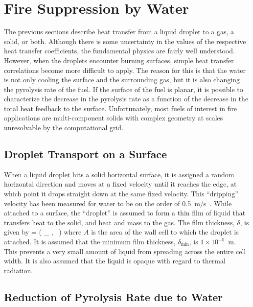 \section{Fire Suppression by Water}

The previous sections describe heat transfer from a liquid droplet to a gas, a solid, or both. Although there is some
uncertainty in the values of the respective heat transfer coefficients,
the fundamental physics are fairly well understood. However, when
the droplets encounter burning surfaces,
simple heat transfer correlations become more difficult to apply.
The reason for this is that the water is not only cooling the surface
and the surrounding gas, but it is also changing the pyrolysis rate
of the fuel. If the surface of the fuel is planar, it is possible
to characterize the decrease in the pyrolysis rate as a function of
the decrease in the total heat feedback to the surface. Unfortunately,
most fuels of interest in fire applications are multi-component solids
with complex geometry at scales unresolvable by the computational grid.

\subsection{Droplet Transport on a Surface}

When a liquid droplet hits a solid horizontal surface, it is assigned a
random horizontal direction and moves at a fixed velocity until it
reaches the edge, at which point it drops straight down at the same
fixed velocity. This ``dripping'' velocity has been measured for water to be on
the order of 0.5~m/s~\cite{Hamins:1,Hamins:IAFSS2002}.
While attached to a surface, the ``droplet'' is assumed to form a thin film of liquid that
transfers heat to the solid, and heat and mass to
the gas. The film thickness, $\delta$, is given by
\be
   \delta = \max \left( \delta_{\min} , \sum {} \,  \right)
\ee
where $A$ is the area of the wall cell to which the droplet is attached. It is assumed that the minimum film thickness, $\delta_{\min}$, is $1 \times 10^{-5}$~m. This prevents a very small amount of liquid from spreading across the entire cell width. It is also assumed that the liquid is opaque with regard to thermal radiation.

\subsection{Reduction of Pyrolysis Rate due to Water}


